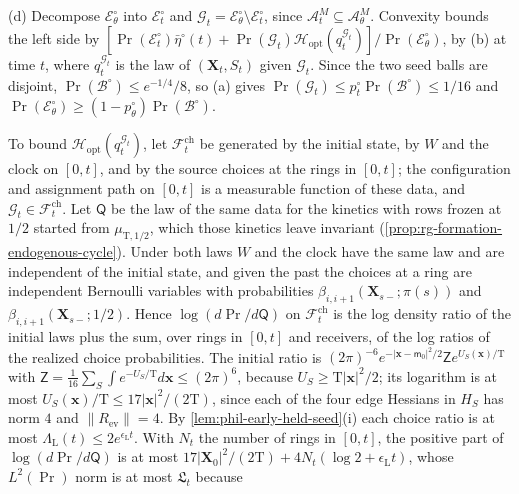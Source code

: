 (d) Decompose \(\mathscr E^\circ_\theta\) into \(\mathscr E^\circ_t\) and
\(\mathscr G_t=\mathscr E^\circ_\theta\setminus\mathscr E^\circ_t\), since
\(\mathscr A^M_t\subseteq\mathscr A^M_\theta\). Convexity bounds the left side
by \([\Pr(\mathscr E^\circ_t)\bar\eta^\circ(t)+\Pr(\mathscr G_t)
\mathcal H_{\mathrm{opt}}(q^{\mathscr G_t}_t)]/\Pr(\mathscr E^\circ_\theta)\),
by (b) at time \(t\), where \(q^{\mathscr G_t}_t\) is the law of
\((\mathbf X_t,S_t)\) given \(\mathscr G_t\). Since the two seed balls are
disjoint, \(\Pr(\mathscr B^\circ)\le e^{-1/4}/8\), so (a) gives
\(\Pr(\mathscr G_t)\le p^\circ_t\Pr(\mathscr B^\circ)\le1/16\) and
\(\Pr(\mathscr E^\circ_\theta)\ge(1-p^\circ_\theta)\Pr(\mathscr B^\circ)\).

To bound \(\mathcal H_{\mathrm{opt}}(q^{\mathscr G_t}_t)\), let
\(\mathcal F^{\mathrm{ch}}_t\) be generated by the initial state, by \(W\) and the clock on
\([0,t]\), and by the source choices at the rings in \([0,t]\); the
configuration and assignment path on \([0,t]\) is a measurable function of
these data, and \(\mathscr G_t\in\mathcal F^{\mathrm{ch}}_t\). Let \(\mathsf Q\) be the law
of the same data for the kinetics with rows frozen at \(1/2\) started from
\(\mu_{\mathrm T,1/2}\), which those kinetics leave invariant
(\cref{prop:rg-formation-endogenous-cycle}). Under both laws \(W\) and the
clock have the same law and are independent of the initial state, and given
the past the choices at a ring are independent Bernoulli variables with
probabilities \(\beta_{i,i+1}(\mathbf X_{s-};\pi(s))\) and
\(\beta_{i,i+1}(\mathbf X_{s-};1/2)\). Hence
\(\log(d\Pr/d\mathsf Q)\) on \(\mathcal F^{\mathrm{ch}}_t\) is the log density ratio of the
initial laws plus the sum, over rings in \([0,t]\) and receivers, of the log
ratios of the realized choice probabilities. The initial ratio is
\((2\pi)^{-6}e^{-|\mathbf x-\mathsf m_0|^2/2}\mathsf Z e^{U_S(\mathbf x)/\mathrm T}\)
with \(\mathsf Z=\frac1{16}\sum_S\int e^{-U_S/\mathrm T}d\mathbf x\le(2\pi)^6\),
because \(U_S\ge\mathrm T|\mathbf x|^2/2\); its logarithm is at most
\(U_S(\mathbf x)/\mathrm T\le17|\mathbf x|^2/(2\mathrm T)\), since each of the
four edge Hessians in \(H_S\) has norm \(4\) and \(\|R_{\mathrm{ev}}\|=4\). By
\cref{lem:phil-early-held-seed}(i) each choice ratio is at most
\(\Lambda_{\mathrm L}(t)\le2e^{\epsilon_{\mathrm L}t}\). With \(N_t\) the
number of rings in \([0,t]\), the positive part of \(\log(d\Pr/d\mathsf Q)\) is
at most \(17|\mathbf X_0|^2/(2\mathrm T)+4N_t(\log2+\epsilon_{\mathrm L}t)\),
whose \(L^2(\Pr)\) norm is at most \(\mathfrak L_t\) because
